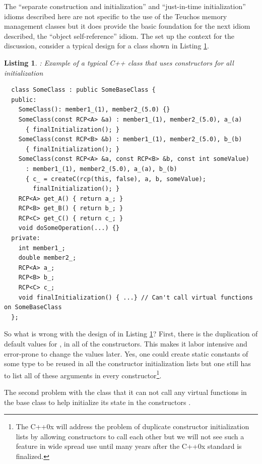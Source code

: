 \documentclass[pdf,ps2pdf,11pt]{SANDreport}
\newtheorem{listing}{Listing}
\begin{document}
The ``separate construction and initialization'' and ``just-in-time
initialization'' idioms described here are not specific to the use of
the Teuchos memory management classes but it does provide the basic
foundation for the next idiom described, the ``object self-reference''
idiom.  The set up the context for the discussion, consider a typical
design for a class shown in Listing
{}\ref{listing:sci:SomeClass-before}.


\begin{listing}: Example of a typical C++ class that uses constructors for all
initialization  \\
\label{listing:sci:SomeClass-before}
{\small\begin{verbatim}
  class SomeClass : public SomeBaseClass {
  public:
    SomeClass(): member1_(1), member2_(5.0) {}
    SomeClass(const RCP<A> &a) : member1_(1), member2_(5.0), a_(a)
      { finalInitialization(); }
    SomeClass(const RCP<B> &b) : member1_(1), member2_(5.0), b_(b)
      { finalInitialization(); }
    SomeClass(const RCP<A> &a, const RCP<B> &b, const int someValue)
      : member1_(1), member2_(5.0), a_(a), b_(b)
      { c_ = createC(rcp(this, false), a, b, someValue);
        finalInitialization(); }
    RCP<A> get_A() { return a_; }
    RCP<B> get_B() { return b_; }
    RCP<C> get_C() { return c_; }
    void doSomeOperation(...) {}
  private:
    int member1_;
    double member2_;
    RCP<A> a_;
    RCP<B> b_;
    RCP<C> c_;
    void finalInitialization() { ...} // Can't call virtual functions on SomeBaseClass
  };

\end{verbatim}}
\end{listing}


So what is wrong with the design of {} in Listing
{}\ref{listing:sci:SomeClass-before}?  First, there is the duplication
of default values for {}, {} in all of
the constructors.  This makes it labor intensive and error-prone to
change the values later.  Yes, one could create static constants of
some type to be reused in all the constructor initialization lists but
one still has to list all of these arguments in every
constructor\footnote{The C++0x will address the problem of duplicate
constructor initialization lists by allowing constructors to call each
other but we will not see such a feature in wide spread use until many
years after the C++0x standard is finalized.}.

The second problem with the class {} that it can not
call any virtual functions in the base class {} to
help initialize its state in the constructors {}\cite[Item
49]{C++CodingStandards05}.
\end{document}
